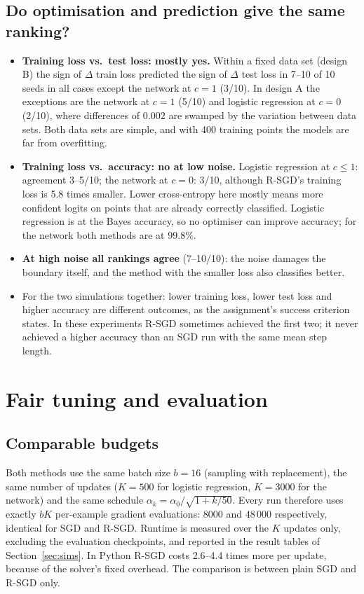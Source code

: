 \documentclass[11pt,a4paper]{article}
\begin{document}
\subsection{Do optimisation and prediction give the same ranking?}\label{sec:ranking}

\begin{itemize}
\item \textbf{Training loss vs.\ test loss: mostly yes.} Within a fixed data set (design B) the
sign of $\Delta$ train loss predicted the sign of $\Delta$ test loss in 7--10 of 10 seeds in all
cases except the network at $c=1$ (3/10). In design A the exceptions are the network at $c=1$
(5/10) and logistic regression at $c=0$ (2/10), where differences of $0.002$ are swamped by the
variation between data sets. Both data sets are simple, and with 400 training points the models
are far from overfitting.
\item \textbf{Training loss vs.\ accuracy: no at low noise.} Logistic regression at $c\le1$:
agreement 3--5/10; the network at $c=0$: 3/10, although R-SGD's training loss is 5.8 times
smaller. Lower cross-entropy here mostly means more confident logits on points that are already
correctly classified. Logistic regression is at the Bayes accuracy, so no optimiser can improve
accuracy; for the network both methods are at $99.8\%$.
\item \textbf{At high noise all rankings agree} (7--10/10): the noise damages the boundary
itself, and the method with the smaller loss also classifies better.
\item For the two simulations together: lower training loss, lower test loss and higher
accuracy are different outcomes, as the assignment's success criterion states. In these
experiments R-SGD sometimes achieved the first two; it never achieved a higher accuracy than an
SGD run with the same mean step length.
\end{itemize}

\section{Fair tuning and evaluation}\label{sec:protocol}

\subsection{Comparable budgets}
Both methods use the same batch size $b=16$ (sampling with replacement), the same number of updates
($K=500$ for logistic regression, $K=3000$ for the network) and the same schedule
$\alpha_k=\alpha_0/\sqrt{1+k/50}$. Every run therefore uses exactly $bK$ per-example gradient
evaluations: $8000$ and $48\,000$ respectively, identical for SGD and R-SGD. Runtime is measured
over the $K$ updates only, excluding the evaluation checkpoints, and reported in the result tables
of Section~\ref{sec:sims}. In Python R-SGD costs 2.6--4.4 times more per update, because of the
solver's fixed overhead. The comparison is between plain SGD and R-SGD only.
\end{document}
